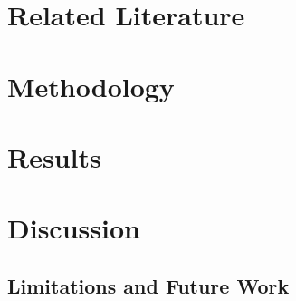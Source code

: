\documentclass{article}
\begin{document}


\section{Related Literature}

    

\section{Methodology}
\label{sec:methodology}

    
    
\section{Results}

    

\section{Discussion}

    
    
\subsection{Limitations and Future Work}

    





\end{document}
